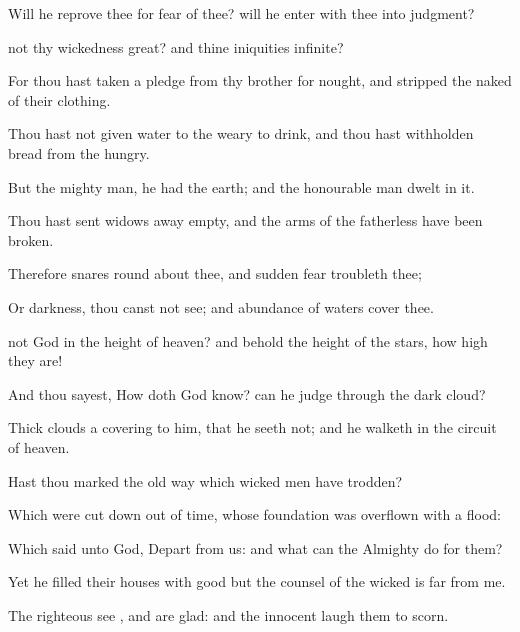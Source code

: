 {Will he
reprove thee for
fear of thee? will he
enter with thee into
judgment?


\par }{\PP {} not thy
wickedness
great? and thine
iniquities
infinite?

For thou hast taken a
pledge from thy
brother for
nought, and
stripped the
naked of their
clothing.

Thou hast not given
water to the
weary to
drink, and thou hast
withholden
bread from the
hungry.

But
{} the
mighty
man, he had the
earth; and the honourable
man
dwelt in it.

Thou hast
sent
widows away
empty, and the
arms of the
fatherless have been
broken.

Therefore
snares
{} round
about thee, and
sudden
fear
troubleth thee;

Or
darkness,
{} thou canst not
see; and
abundance of
waters
cover thee.

 not
God in the
height of
heaven? and
behold the
height of the
stars, how
high they are!

And thou
sayest, How doth
God
know? can he
judge through the dark
cloud?

Thick
clouds
{} a
covering to him, that he
seeth not; and he
walketh in the
circuit of
heaven.


\par }{\PP {}Hast thou
marked the
old
way which
wicked
men have
trodden?

Which were cut
down out of
time, whose
foundation was
overflown with a
flood:

Which
said unto
God,
Depart from us: and what can the
Almighty
do for them?

Yet he
filled their
houses with
good
{} but the
counsel of the
wicked is
far from me.

The
righteous
see
{}, and are
glad: and the
innocent laugh them to
scorn.

}
